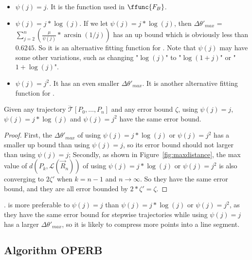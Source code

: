 {\begin{itemize}
  \item  {$\psi(j) = j$. It is the function used in $\ffunc{F_B}$.}

  \item  {$\psi(j) = j*\log(j)$. If we let $\psi(j) = j*\log(j)$, then $\Delta\theta'_{max}$ = $\sum_{j=2}^n\left( \frac{\mu}{\psi(j)} * {\arcsin(1/j)} \right)$ has an up bound which is obviously less than $0.6245$. So it is an alternative fitting function for \operaa. Note that $\psi(j)$ may have some other variations, such as changing "$\log(j)$" to "$\log(1+j)$" or "$1+ \log(j)$".}

  \item  {$\psi(j) = j^2$. It has an even smaller $\Delta\theta'_{max}$. It is another alternative fitting function for \operaa.}

\end{itemize}

\begin{theorem}
\label{ffunction}
Given any trajectory $\dddot{\mathcal{T}}[P_0, \ldots, P_n]$ and any error bound $\zeta$, \operaa using $\psi(j)= j$, $\psi(j)= j*\log(j)$ and $\psi(j)= j^2$ have the same error bound.
\end{theorem}

\begin{proof}
First, the $\Delta\theta'_{max}$ of \operaa using $\psi(j)= j*\log(j)$ or $\psi(j)= j^2$ has a smaller up bound than using $\psi(j)= j$, so its error bound should not larger than using $\psi(j)= j$; Secondly, as shown in Figure~\ref{fig:maxdistance}, the max value of $d(P_k, {\mathcal{L}}(\vec{R}_{n}))$ of \operaa using $\psi(j)= j*\log(j)$ or $\psi(j)= j^2$  is also converging to $2\zeta'$ when $k=n-1$ and $n \to \infty$. So they have the same error bound, and they are all error bounded by $2*\zeta' = \zeta$.
\end{proof}

. \operaa is more preferable to $\psi(j)= j$ than $\psi(j)= j*\log(j)$ or $\psi(j)= j^2$, as they have the same error bound for stepwise trajectories  while \operaa using $\psi(j)= j$ has a larger $\Delta\theta'_{max}$, so it is likely to compress more points into a line segment.





\subsection{Algorithm OPERB}
\label{subsec-algorithm}

}
